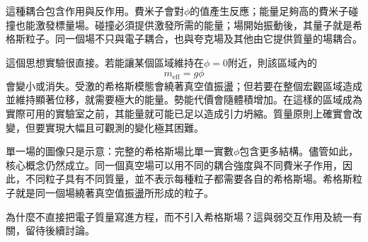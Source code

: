 這種耦合包含作用與反作用。費米子會對\(\phi\)的值產生反應；能量足夠高的費米子碰撞也能激發標量場。碰撞必須提供激發所需的能量；場開始振動後，其量子就是希格斯粒子。同一個場不只與電子耦合，也與夸克場及其他由它提供質量的場耦合。

\begin{classroomqa}
\end{classroomqa}

這個思想實驗很直接。若能讓某個區域維持在\(\phi=0\)附近，則該區域內的
\begin{equation}
m_{\mathrm{eff}}=g\phi
\end{equation}
會變小或消失。受激的希格斯模態會繞著真空值振盪；但若要在整個宏觀區域造成並維持顯著位移，就需要極大的能量。勢能代價會隨體積增加。在這樣的區域成為實際可用的實驗室之前，其能量就可能已足以造成引力坍縮。質量原則上確實會改變，但要實現大幅且可觀測的變化極其困難。

\begin{classroomqa}
\end{classroomqa}

\begin{classroomqa}
\end{classroomqa}

單一場的圖像只是示意：完整的希格斯場比單一實數\(\phi\)包含更多結構。儘管如此，核心概念仍然成立。同一個真空場可以用不同的耦合強度與不同費米子作用，因此，不同粒子具有不同質量，並不表示每種粒子都需要各自的希格斯場。希格斯粒子就是同一個場繞著真空值振盪所形成的粒子。

為什麼不直接把電子質量寫進方程，而不引入希格斯場？這與弱交互作用及統一有關，留待後續討論。

\begin{classroomqa}
\end{classroomqa}

